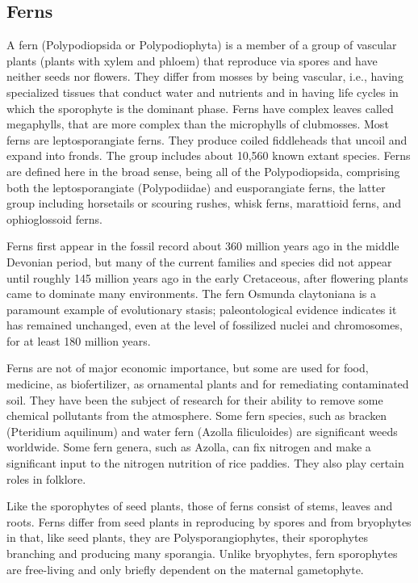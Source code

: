 \hypertarget{ferns}{%
\subsection{Ferns}\label{ferns}}

A fern (Polypodiopsida or Polypodiophyta) is a member of a group of vascular plants (plants with xylem and phloem) that reproduce via spores and have neither seeds nor flowers. They differ from mosses by being vascular, i.e., having specialized tissues that conduct water and nutrients and in having life cycles in which the sporophyte is the dominant phase. Ferns have complex leaves called megaphylls, that are more complex than the microphylls of clubmosses. Most ferns are leptosporangiate ferns. They produce coiled fiddleheads that uncoil and expand into fronds. The group includes about 10,560 known extant species. Ferns are defined here in the broad sense, being all of the Polypodiopsida, comprising both the leptosporangiate (Polypodiidae) and eusporangiate ferns, the latter group including horsetails or scouring rushes, whisk ferns, marattioid ferns, and ophioglossoid ferns.

Ferns first appear in the fossil record about 360 million years ago in the middle Devonian period, but many of the current families and species did not appear until roughly 145 million years ago in the early Cretaceous, after flowering plants came to dominate many environments. The fern Osmunda claytoniana is a paramount example of evolutionary stasis; paleontological evidence indicates it has remained unchanged, even at the level of fossilized nuclei and chromosomes, for at least 180 million years.

Ferns are not of major economic importance, but some are used for food, medicine, as biofertilizer, as ornamental plants and for remediating contaminated soil. They have been the subject of research for their ability to remove some chemical pollutants from the atmosphere. Some fern species, such as bracken (Pteridium aquilinum) and water fern (Azolla filiculoides) are significant weeds worldwide. Some fern genera, such as Azolla, can fix nitrogen and make a significant input to the nitrogen nutrition of rice paddies. They also play certain roles in folklore.

Like the sporophytes of seed plants, those of ferns consist of stems, leaves and roots. Ferns differ from seed plants in reproducing by spores and from bryophytes in that, like seed plants, they are Polysporangiophytes, their sporophytes branching and producing many sporangia. Unlike bryophytes, fern sporophytes are free-living and only briefly dependent on the maternal gametophyte.

